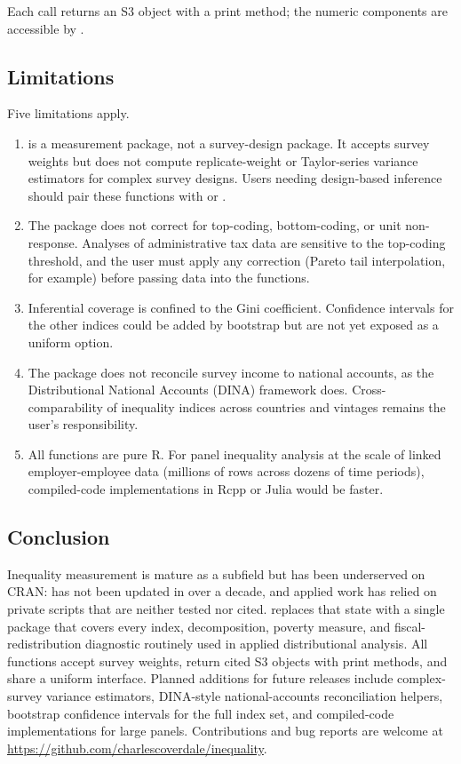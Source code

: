 Each call returns an S3 object with a print method; the numeric
components are accessible by \code{\$}.

\subsection{Limitations}\label{limitations}

Five limitations apply.

\begin{enumerate}
\def\labelenumi{\arabic{enumi}.}
\tightlist
\item
   is a measurement package, not a survey-design
  package. It accepts survey weights but does not compute
  replicate-weight or Taylor-series variance estimators for complex
  survey designs. Users needing design-based inference should pair these
  functions with  or .
\item
  The package does not correct for top-coding, bottom-coding, or unit
  non-response. Analyses of administrative tax data are sensitive to the
  top-coding threshold, and the user must apply any correction (Pareto
  tail interpolation, for example) before passing data into the
  functions.
\item
  Inferential coverage is confined to the Gini coefficient. Confidence
  intervals for the other indices could be added by bootstrap but are
  not yet exposed as a uniform option.
\item
  The package does not reconcile survey income to national accounts, as
  the Distributional National Accounts (DINA) framework does.
  Cross-comparability of inequality indices across countries and
  vintages remains the user's responsibility.
\item
  All functions are pure R. For panel inequality analysis at the scale
  of linked employer-employee data (millions of rows across dozens of
  time periods), compiled-code implementations in Rcpp or Julia would be
  faster.
\end{enumerate}

\FloatBarrier

\subsection{Conclusion}\label{conclusion}

Inequality measurement is mature as a subfield but has been underserved
on CRAN:  has not been updated in over a decade, and
applied work has relied on private scripts that are neither tested nor
cited.  replaces that state with a single package
that covers every index, decomposition, poverty measure, and
fiscal-redistribution diagnostic routinely used in applied
distributional analysis. All functions accept survey weights, return
cited S3 objects with print methods, and share a uniform interface.
Planned additions for future releases include complex-survey variance
estimators, DINA-style national-accounts reconciliation helpers,
bootstrap confidence intervals for the full index set, and compiled-code
implementations for large panels. Contributions and bug reports are
welcome at \url{https://github.com/charlescoverdale/inequality}.

